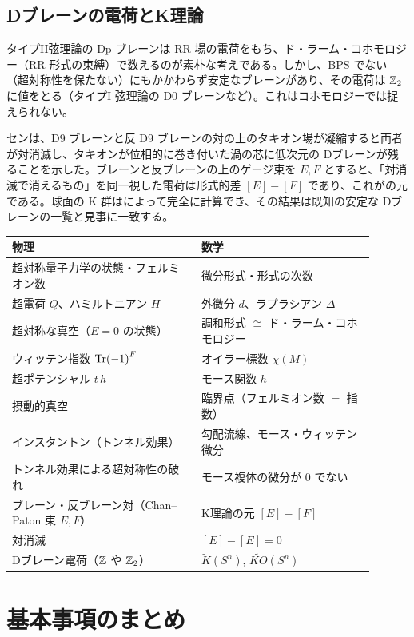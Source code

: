 \subsection*{Dブレーンの電荷とK理論}
タイプII弦理論の Dp ブレーンは RR 場の電荷をもち、ド・ラーム・コホモロジー（RR 形式の束縛）で数えるのが素朴な考えである。しかし、BPS でない（超対称性を保たない）にもかかわらず安定なブレーンがあり、その電荷は $\mathbb{Z}_2$ に値をとる（タイプI 弦理論の D0 ブレーンなど）。これはコホモロジーでは捉えられない。

センは、D9 ブレーンと反 D9 ブレーンの対の上のタキオン場が凝縮すると両者が対消滅し、タキオンが位相的に巻き付いた渦の芯に低次元の Dブレーンが残ることを示した。ブレーンと反ブレーンの上のゲージ束を $E,F$ とすると、「対消滅で消えるもの」を同一視した電荷は形式的差 $[E]-[F]$ であり、これがの元である。球面の K 群はによって完全に計算でき、その結果は既知の安定な Dブレーンの一覧と見事に一致する。

\begin{physbox}[：本章の辞書]
\begin{center}
\small
\begin{tabular}{p{0.47\linewidth}p{0.43\linewidth}}
物理 & 数学\\ \hline
超対称量子力学の状態・フェルミオン数 & 微分形式・形式の次数\\
超電荷 $Q$、ハミルトニアン $H$ & 外微分 $d$、ラプラシアン $\Delta$\\
超対称な真空（$E=0$ の状態） & 調和形式 $\cong$ ド・ラーム・コホモロジー\\
ウィッテン指数 $\Tr(-1)^F$ & オイラー標数 $\chi(M)$\\
超ポテンシャル $t\,h$ & モース関数 $h$\\
摂動的真空 & 臨界点（フェルミオン数 $=$ 指数）\\
インスタントン（トンネル効果） & 勾配流線、モース・ウィッテン微分\\
トンネル効果による超対称性の破れ & モース複体の微分が $0$ でない\\
ブレーン・反ブレーン対（Chan--Paton 束 $E,F$） & K理論の元 $[E]-[F]$\\
対消滅 & $[E]-[E]=0$\\
Dブレーン電荷（$\mathbb{Z}$ や $\mathbb{Z}_2$） & $\tilde K(S^n)$, $\widetilde{KO}(S^n)$
\end{tabular}
\end{center}
\end{physbox}

\section{基本事項のまとめ}

